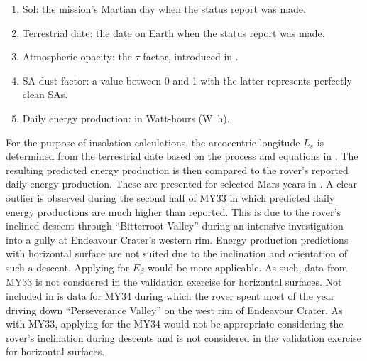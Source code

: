 \begin{enumerate}[label=\textcolor{BulletBlue}{(\alph*)}]
  \item Sol: the mission's Martian day when the status report was made.
  \item Terrestrial date: the date on Earth when the status report was made.
  \item Atmospheric opacity: the $\tau$ factor, introduced in  .
  \item \ac{SA} dust factor: a value between 0 and 1 with the latter represents perfectly clean \acp{SA}.
  \item Daily energy production: in Watt-hours (\si{\watt\hour}).
\end{enumerate}

For the purpose of insolation calculations, the areocentric longitude $L_{s}$ is determined from the terrestrial date based on the process and equations in . The resulting predicted energy production is then compared to the rover's reported daily energy production. These are presented for selected Mars years in . A clear outlier is observed during the second half of \ac{MY}33 in which predicted daily energy productions are much higher than reported. This is due to the rover's inclined descent through ``Bitterroot Valley'' during an intensive investigation into a gully at Endeavour Crater's western rim. Energy production predictions with horizontal surface  are not suited due to the inclination and orientation of such a descent. Applying  for $E_{\beta}$ would be more applicable. As such, data from \ac{MY}33 is not considered in the validation exercise for horizontal surfaces. Not included in  is data for \ac{MY}34 during which the rover spent most of the year driving down ``Perseverance Valley'' on the west rim of Endeavour Crater. As with \ac{MY}33, applying  for the \ac{MY}34 would not be appropriate considering the rover's inclination during descents and is not considered in the validation exercise for horizontal surfaces.

